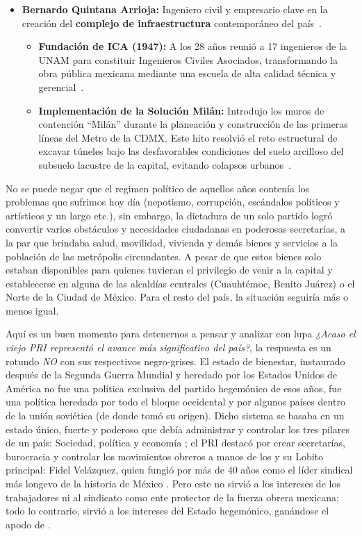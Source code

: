 \begin{itemize}
    \item \textbf{Bernardo Quintana Arrioja:} Ingeniero civil y empresario clave en la creación del \textbf{complejo de infraestructura} contemporáneo
          del país~\cite{fundacionica2023viaje}.
    \begin{itemize}
        \item \textbf{Fundación de ICA (1947):} A los 28 años reunió a 17 ingenieros de la UNAM para constituir Ingenieros Civiles Asociados,
              transformando la obra pública mexicana mediante una escuela de alta calidad técnica y gerencial~\cite{fundacionica2023viaje}.
        \item \textbf{Implementación de la Solución Milán:} Introdujo los muros de contención ``Milán''
              durante la planeación y construcción de las primeras líneas del Metro de la CDMX. Este hito resolvió el reto estructural de
              excavar túneles bajo las desfavorables condiciones del suelo arcilloso del subsuelo lacustre de la capital, evitando colapsos urbanos~\cite{fundacionica2023viaje}.
    \end{itemize}

\end{itemize}

No se puede negar que el regimen político de aquellos años contenía los problemas que sufrimos hoy día (nepotismo, corrupción, escándalos políticos y artísticos 
y un largo etc.), sin embargo, la dictadura de un solo partido logró convertir varios obstáculos y necesidades ciudadanas en poderosas secretarías, 
a la par que brindaba salud, movilidad, vivienda y demás bienes y servicios a la población de las metrópolis circundantes. A pesar de que estos bienes
solo estaban disponibles para quienes tuvieran el privilegio de venir a la capital y establecerse en alguna de las alcaldías centrales (Cuauhtémoc, Benito Juárez)
o el Norte de la Ciudad de México. Para el resto del país, la situación seguiría más o menos igual.


Aquí es un buen momento para detenernos a pensar y analizar con lupa \textit{¿Acaso el viejo PRI representó el avance más significativo del país?}, la respuesta 
es un rotundo \textit{NO} con sus respectivos negro-grises. El estado de bienestar, instaurado después de la Segunda Guerra Mundial y heredado por los 
Estados Unidos de América no fue una política exclusiva del partido hegemónico de esos años, fue una política heredada por todo el bloque occidental y por algunos 
países dentro de la unión soviética (de donde tomó su origen). Dicho sistema se basaba en un estado único, fuerte y poderoso que debía administrar y controlar los 
tres pilares de un país: Sociedad, política y economía \cite{bauman_estado}; el PRI destacó por crear secretarías, burocracia y controlar los movimientos obreros a manos de los
 y su Lobito principal: Fidel Velázquez, quien fungió por más de 40 años como el líder sindical más longevo de la historia de México \cite{agustin_tragicomedia1}.
Pero este no sirvió a los intereses de los trabajadores ni al sindicato como ente protector de la fuerza obrera mexicana; todo lo contrario, sirvió a los intereses del Estado
hegemónico, ganándose el apodo de .


